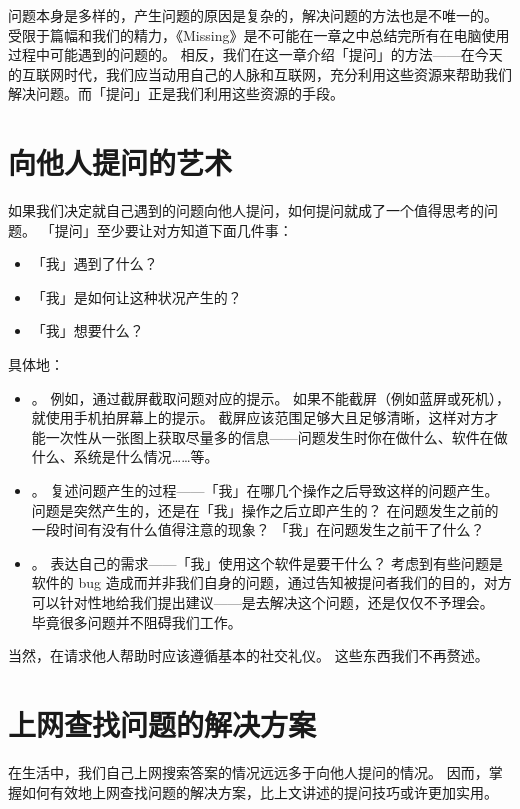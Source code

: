 问题本身是多样的，产生问题的原因是复杂的，解决问题的方法也是不唯一的。
受限于篇幅和我们的精力，《Missing》是不可能在一章之中总结完所有在电脑使用过程中可能遇到的问题的。
相反，我们在这一章介绍「提问」的方法——在今天的互联网时代，我们应当动用自己的人脉和互联网，充分利用这些资源来帮助我们解决问题。而「提问」正是我们利用这些资源的手段。

\section{向他人提问的艺术}

如果我们决定就自己遇到的问题向他人提问，如何提问就成了一个值得思考的问题。
「提问」至少要让对方知道下面几件事：

\begin{itemize}
  \item 「我」遇到了什么？
  \item 「我」是如何让这种状况产生的？
  \item 「我」想要什么？
\end{itemize}

具体地：

\begin{itemize}
  \item {}。
    例如，通过截屏截取问题对应的提示。
    如果不能截屏（例如蓝屏或死机），就使用手机拍屏幕上的提示。
    截屏应该范围足够大且足够清晰，这样对方才能一次性从一张图上获取尽量多的信息——问题发生时你在做什么、软件在做什么、系统是什么情况……等。
  \item {}。
    复述问题产生的过程——「我」在哪几个操作之后导致这样的问题产生。
    问题是突然产生的，还是在「我」操作之后立即产生的？
    在问题发生之前的一段时间有没有什么值得注意的现象？
    「我」在问题发生之前干了什么？
  \item {}。
    表达自己的需求——「我」使用这个软件是要干什么？
    考虑到有些问题是软件的 bug 造成而并非我们自身的问题，通过告知被提问者我们的目的，对方可以针对性地给我们提出建议——是去解决这个问题，还是仅仅不予理会。
    毕竟很多问题并不阻碍我们工作。
\end{itemize}

当然，在请求他人帮助时应该遵循基本的社交礼仪。
这些东西我们不再赘述。

\section{上网查找问题的解决方案}

在生活中，我们自己上网搜索答案的情况远远多于向他人提问的情况。
因而，掌握如何有效地上网查找问题的解决方案，比上文讲述的提问技巧或许更加实用。

